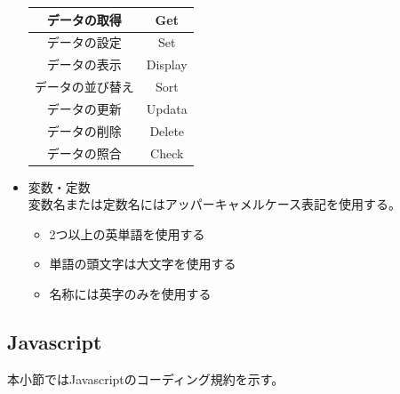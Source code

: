 \documentclass[a4j]{jarticle}
\begin{document}
\begin{itemize}
\begin{table}[H]
			\label{tab:o2}
			\begin{center}
			\begin{tabular}{|c|c|}
			\hline
			データの取得 & Get\\\hline
			データの設定 & Set\\\hline
			データの表示 & Display\\\hline
			データの並び替え & Sort\\\hline
			データの更新  & Updata\\\hline
			データの削除  & Delete\\\hline
			データの照合 & Check\\\hline
			\end{tabular}
			\end{center}
			\end{table}
	\item 変数・定数\\
		変数名または定数名にはアッパーキャメルケース表記を使用する。
	\begin{itemize}
		\item 2つ以上の英単語を使用する
		\item 単語の頭文字は大文字を使用する
		\item 名称には英字のみを使用する
	\end{itemize}


\end{itemize}
\subsection{Javascript}

本小節ではJavascriptのコーディング規約を示す。
\end{document}
